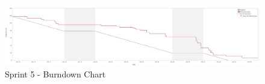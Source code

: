 \begin{figure}[H]
    \centering
         \includegraphics[width = 1\textwidth]{VAPIQ-PICTURES/BDSprint5}
      \caption{Sprint 5 - Burndown Chart}
    \label{fig:bds5}
\end{figure} 

